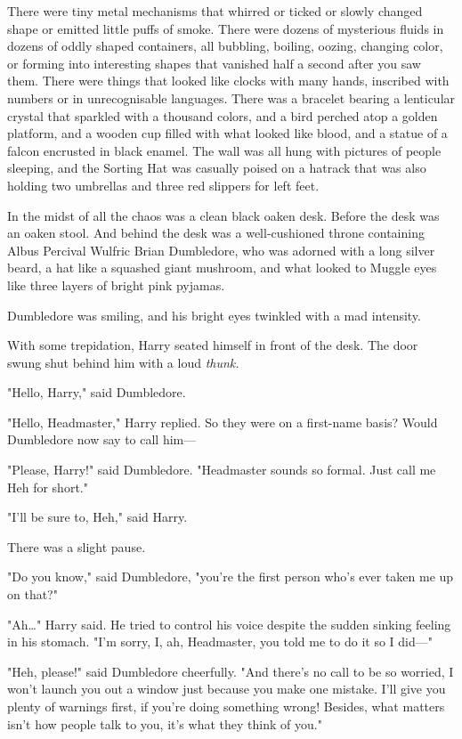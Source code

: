 There were tiny metal mechanisms that whirred or ticked or slowly changed shape
or emitted little puffs of smoke. There were dozens of mysterious fluids in
dozens of oddly shaped containers, all bubbling, boiling, oozing, changing
color, or forming into interesting shapes that vanished half a second after you
saw them. There were things that looked like clocks with many hands, inscribed
with numbers or in unrecognisable languages. There was a bracelet bearing a
lenticular crystal that sparkled with a thousand colors, and a bird perched
atop a golden platform, and a wooden cup filled with what looked like blood,
and a statue of a falcon encrusted in black enamel. The wall was all hung with
pictures of people sleeping, and the Sorting Hat was casually poised on a
hatrack that was also holding two umbrellas and three red slippers for left
feet.

In the midst of all the chaos was a clean black oaken desk. Before the desk was
an oaken stool. And behind the desk was a well-cushioned throne containing
Albus Percival Wulfric Brian Dumbledore, who was adorned with a long silver
beard, a hat like a squashed giant mushroom, and what looked to Muggle eyes
like three layers of bright pink pyjamas.

Dumbledore was smiling, and his bright eyes twinkled with a mad intensity.

With some trepidation, Harry seated himself in front of the desk. The door
swung shut behind him with a loud \emph{thunk.}

"Hello, Harry," said Dumbledore.

"Hello, Headmaster," Harry replied. So they were on a first-name basis? Would
Dumbledore now say to call him---

"Please, Harry!" said Dumbledore. "Headmaster sounds so formal. Just call me
Heh for short."

"I'll be sure to, Heh," said Harry.

There was a slight pause.

"Do you know," said Dumbledore, "you're the first person who's ever taken me up
on that?"

"Ah{\ldots}" Harry said. He tried to control his voice despite the sudden
sinking feeling in his stomach. "I'm sorry, I, ah, Headmaster, you told me to
do it so I did---"

"Heh, please!" said Dumbledore cheerfully. "And there's no call to be so
worried, I won't launch you out a window just because you make one mistake.
I'll give you plenty of warnings first, if you're doing something wrong!
Besides, what matters isn't how people talk to you, it's what they think of
you."

